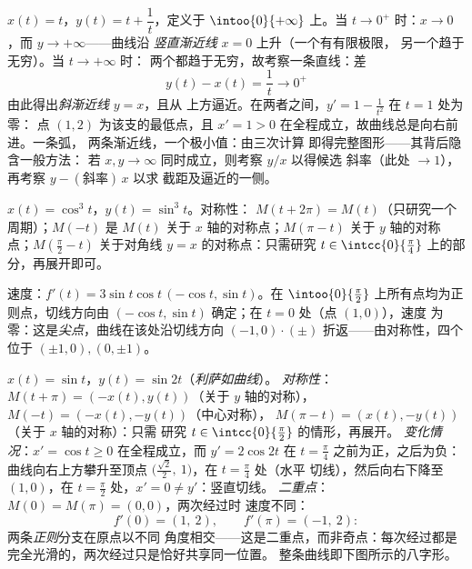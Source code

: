 \begin{example}[渐近分支，详解]
\label{ex:b1:curves:asymptotes}
$x(t) = t$，$y(t) = t + \dfrac1t$，定义于 $\intoo{0}{+\infty}$ 上。当 $t
\to 0^{+}$ 时：$x \to 0$，而 $y \to +\infty$——曲线沿
\emph{竖直渐近线} $x = 0$ 上升（一个有有限极限，
另一个趋于无穷）。当 $t \to +\infty$ 时：
两个都趋于无穷，故考察一条直线：差
\[
y(t) - x(t) = \frac1t \longrightarrow 0^{+}
\]
由此得出\emph{斜渐近线} $y = x$，且从
上方逼近。在两者之间，$y' = 1 - \frac1{t^2}$ 在 $t = 1$ 处为零：
点 $(1, 2)$ 为该支的最低点，且 $x' = 1 >
0$ 在全程成立，故曲线总是向右前进。一条弧，
两条渐近线，一个极小值：由三次计算
即得完整图形——其背后隐含一般方法：
若 $x, y \to \infty$ 同时成立，则考察 $y/x$ 以得候选
斜率（此处 $\to 1$），再考察 $y - (\text{斜率})\,x$ 以求
截距及逼近的一侧。
\end{example}

\begin{example}[星形线]\label{ex:b1:curves:astroid}
$x(t) = \cos^3 t$，$y(t) = \sin^3 t$。对称性：
$M(t + 2\pi) = M(t)$（只研究一个周期）；$M(-t)$ 是
$M(t)$ 关于 $x$ 轴的对称点；$M(\pi - t)$ 关于 $y$ 轴的对称点；$M(\frac\pi2 -
t)$ 关于对角线 $y = x$ 的对称点：只需研究 $t \in
\intcc{0}{\frac\pi4}$ 上的部分，再展开即可。

速度：$f'(t) = 3\sin t\cos t\,(-\cos t, \sin t)$。在
$\intoo{0}{\frac\pi2}$ 上所有点均为正则点，切线方向由
$(-\cos t, \sin t)$ 确定；在 $t = 0$ 处（点 $(1,0)$），速度
为零：这是\emph{尖点}，曲线在该处沿切线方向
$(-1, 0)\cdot(\pm)$ 折返——由对称性，四个
位于 $(\pm1, 0), (0, \pm1)$。
\end{example}

\begin{example}[八字形曲线的完整研究]
\label{ex:b1:curves:lissajous}
$x(t) = \sin t$，$y(t) = \sin 2t$（\emph{利萨如曲线}）。
\emph{对称性}：$M(t + \pi) = (-x(t), y(t))$（关于
$y$ 轴的对称），$M(-t) = (-x(t), -y(t))$（中心对称），
$M(\pi - t) = (x(t), -y(t))$（关于 $x$ 轴的对称）：只需
研究 $t \in \intcc{0}{\frac\pi2}$ 的情形，再展开。
\emph{变化情况}：$x' = \cos t \geq 0$ 在全程成立，而 $y' =
2\cos 2t$ 在 $t = \frac\pi4$ 之前为正，之后为负：
曲线向右上方攀升至顶点
$\bigl(\frac{\sqrt2}2,\ 1\bigr)$，在 $t = \frac\pi4$ 处（水平
切线），然后向右下降至 $(1, 0)$，在 $t =
\frac\pi2$ 处，$x' = 0 \neq y'$：竖直切线。
\emph{二重点}：$M(0) = M(\pi) = (0,0)$，两次经过时
速度不同：
\[
f'(0) = (1,\ 2), \qquad f'(\pi) = (-1,\ 2) :
\]
两条\emph{正则}分支在原点以不同
角度相交——这是二重点，而非奇点：每次经过都是
完全光滑的，两次经过只是恰好共享同一位置。
整条曲线即下图所示的八字形。
\end{example}


